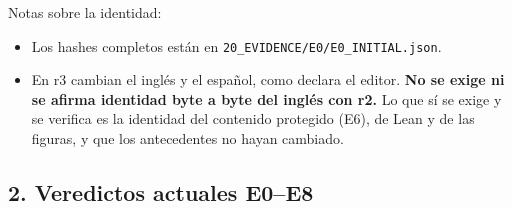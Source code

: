 \documentclass[
]{article}
\providecommand{\tightlist}{%
  \setlength{\itemsep}{0pt}\setlength{\parskip}{0pt}}
\begin{document}
Notas sobre la identidad:

\begin{itemize}
\tightlist
\item
  Los hashes completos están en
  \texttt{20\_EVIDENCE/E0/E0\_INITIAL.json}.
\item
  En r3 cambian el inglés y el español, como declara el editor.
  \textbf{No se exige ni se afirma identidad byte a byte del inglés con
  r2.} Lo que sí se exige y se verifica es la identidad del contenido
  protegido (E6), de Lean y de las figuras, y que los antecedentes no
  hayan cambiado.
\end{itemize}

\subsection{2. Veredictos actuales
E0--E8}\label{2-veredictos-actuales-e0e8}
\end{document}
